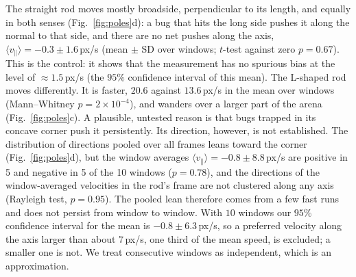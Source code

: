 \documentclass[11pt]{article}
\begin{document}
The straight rod moves mostly broadside, perpendicular to its length, and equally in both senses (Fig.~\ref{fig:poles}d): a bug that hits the long side pushes it along the normal to that side, and there are no net pushes along the axis, $\langle v_\parallel\rangle=-0.3\pm1.6\,$px/s (mean $\pm$ SD over windows; $t$-test against zero $p=0.67$).
This is the control: it shows that the measurement has no spurious bias at the level of $\approx1.5\,$px/s (the $95\%$ confidence interval of this mean).
The L-shaped rod moves differently.
It is faster, $20.6$ against $13.6\,$px/s in the mean over windows (Mann--Whitney $p=2\times10^{-4}$), and wanders over a larger part of the arena (Fig.~\ref{fig:poles}c).
A plausible, untested reason is that bugs trapped in its concave corner push it persistently.
Its direction, however, is not established.
The distribution of directions pooled over all frames leans toward the corner (Fig.~\ref{fig:poles}d), but the window averages $\langle v_\parallel\rangle=-0.8\pm8.8\,$px/s are positive in 5 and negative in 5 of the 10 windows ($p=0.78$), and the directions of the window-averaged velocities in the rod's frame are not clustered along any axis (Rayleigh test, $p=0.95$).
The pooled lean therefore comes from a few fast runs and does not persist from window to window.
With $10$ windows our $95\%$ confidence interval for the mean is $-0.8\pm6.3\,$px/s, so a preferred velocity along the axis larger than about $7\,$px/s, one third of the mean speed, is excluded; a smaller one is not.
We treat consecutive windows as independent, which is an approximation.
\end{document}
